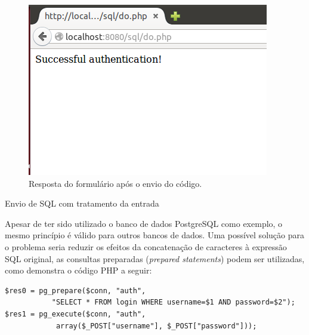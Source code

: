 \begin{frame}{}

  \begin{figure}
    \centering
    \includegraphics[scale=.5]{sql-rsp.png}
    \caption{Resposta do formulário após o envio do código.}
  \end{figure}
\end{frame}

\begin{frame}[fragile]{}{Envio de SQL com tratamento da entrada}

Apesar de ter sido utilizado o banco de dados PostgreSQL como exemplo,
o mesmo princípio é válido para outros bancos de dados.
Uma possível solução para o problema seria reduzir os efeitos da
concatenação de caracteres à expressão SQL original, as consultas
preparadas ({\it prepared statements}) podem ser utilizadas, como
demonstra o código PHP a seguir:

{\small
\begin{verbatim}
$res0 = pg_prepare($conn, "auth", 
           "SELECT * FROM login WHERE username=$1 AND password=$2");
$res1 = pg_execute($conn, "auth",  
            array($_POST["username"], $_POST["password"]));
\end{verbatim}
}

\end{frame}


